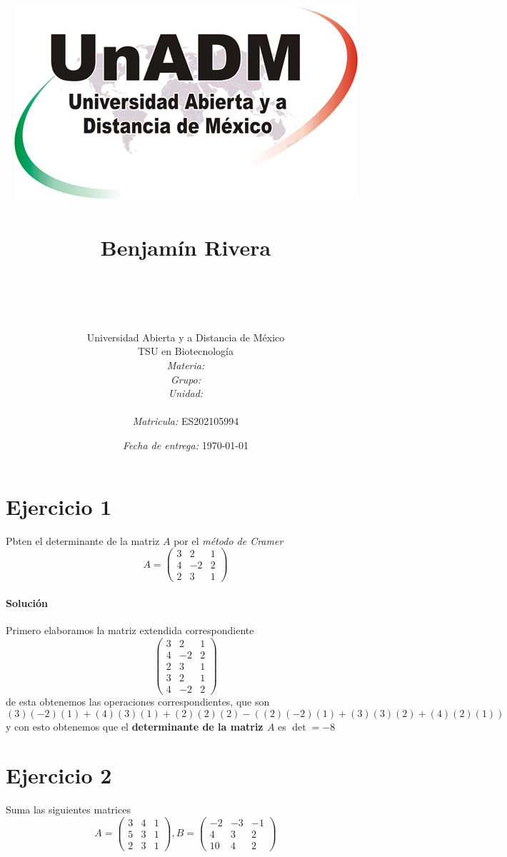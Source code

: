 \documentclass[12pt]{article}
\title{
	\includegraphics{../../../assets/logo-unadm} \\
	\ \\ Benjam\'in Rivera \\
	\bf{\titulo}\\\ \\}
\author{
	Universidad Abierta y a Distancia de México \\
	TSU en Biotecnolog\'ia \\
	\textit{Materia:} \materia \\
	\textit{Grupo:} \grupo \\
	\textit{Unidad:} \unidad \\
	\\
	\textit{Matricula:} ES202105994 }
\date{\textit{Fecha de entrega:} \today}
\begin{document}
\maketitle\newpage

\section*{Ejercicio 1}
	\par Pbten el determinante de la matriz $A$ por el \textit{m\'etodo de Cramer}
		$$A = \begin{pmatrix}
		    3 & 2 & 1 \\
		    4 &-2 & 2 \\
		    2 & 3 & 1
		\end{pmatrix}$$
    
    \paragraph{Soluci\'on} Primero elaboramos la matriz extendida correspondiente
		$$\left(\begin{array}{rrr}
			3 & 2 & 1 \\
			4 & -2 & 2 \\
			2 & 3 & 1 \\
			3 & 2 & 1 \\
			4 & -2 & 2
		\end{array}\right)$$
	de esta obtenemos las operaciones correspondientes, que son
		$$(3)(-2)(1) + (4)(3)(1) + (2)(2)(2)-((2)(-2)(1) + (3)(3)(2) + (4)(2)(1))$$
	y con esto obtenemos que el \textbf{determinante de la matriz $A$} es $\det = -8$



\section*{Ejercicio 2}
	\par Suma las siguientes matrices
		$$ A = \begin{pmatrix} 
		    3 & 4 & 1 \\ 5 & 3 & 1 \\ 2 & 3 & 1 
		    \end{pmatrix}, 
		B = \begin{pmatrix}
		    -2 & -3 & -1 \\ 4 & 3 & 2 \\ 10 & 4 & 2
		    \end{pmatrix} $$
		    
\end{document}
